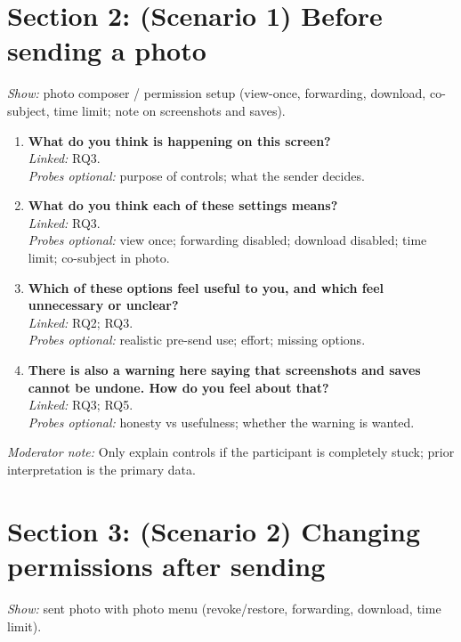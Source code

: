 \section{Section 2: (Scenario 1) Before sending a photo}
\textit{Show:} photo composer / permission setup (view-once, forwarding, download, co-subject, time limit; note on screenshots and saves).


\begin{enumerate}[resume]
  \item \textbf{What do you think is happening on this screen?}\\
  \textit{Linked:} RQ3.\\
  \textit{Probes optional:} purpose of controls; what the sender decides.

  \item \textbf{What do you think each of these settings means?}\\
  \textit{Linked:} RQ3.\\
  \textit{Probes optional:} view once; forwarding disabled; download disabled; time limit; co-subject in photo.

  \item \textbf{Which of these options feel useful to you, and which feel unnecessary or unclear?}\\
  \textit{Linked:} RQ2; RQ3.\\
  \textit{Probes optional:} realistic pre-send use; effort; missing options.

  \item \textbf{There is also a warning here saying that screenshots and saves cannot be undone. How do you feel about that?}\\
  \textit{Linked:} RQ3; RQ5.\\
  \textit{Probes optional:} honesty vs usefulness; whether the warning is wanted.
\end{enumerate}

\textit{Moderator note:} Only explain controls if the participant is completely stuck; prior interpretation is the primary data.

\section{Section 3: (Scenario 2) Changing permissions after sending}
\textit{Show:} sent photo with photo menu (revoke/restore, forwarding, download, time limit).


